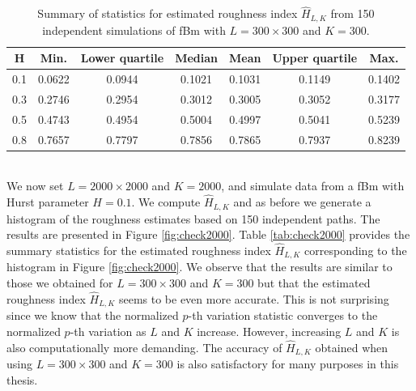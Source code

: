 \documentclass{article}
\begin{document}
\begin{table}[htbp]
    \centering
    \begin{tabular}{ccccccc}
        \toprule
        H & Min. & Lower quartile & Median & Mean & Upper quartile & Max. \\
        \midrule
        0.1 & 0.0622 & 0.0944 & 0.1021 & 0.1031 & 0.1149 & 0.1402 \\
        0.3 & 0.2746 & 0.2954 & 0.3012 & 0.3005 & 0.3052 & 0.3177 \\
        0.5 & 0.4743 & 0.4954 & 0.5004 & 0.4997 & 0.5041 & 0.5239 \\
        0.8 & 0.7657 & 0.7797 & 0.7856 & 0.7865 & 0.7937 & 0.8239 \\
        \bottomrule
    \end{tabular}
    \caption{Summary of statistics for estimated roughness index $\widehat{H}_{L,K}$ from 150 independent simulations of fBm with $L=300\times 300$ and $K=300$.}
    \label{tab:checkhist}
\end{table}\\
We now set $L=2000\times 2000$ and $K=2000$, and simulate data from a fBm with Hurst parameter $H=0.1$. We compute $\hat{H}_{L,K}$ and as before we generate a histogram of the roughness estimates based on 150 independent paths. The results are presented in Figure \ref{fig:check2000}. Table \ref{tab:check2000} provides the summary statistics for the estimated roughness index $\widehat{H}_{L,K}$ corresponding to the histogram in Figure \ref{fig:check2000}. We observe that the results are similar to those we obtained for $L=300\times 300$ and $K=300$ but that the estimated roughness index $\hat{H}_{L,K}$ seems to be even more accurate. This is not surprising since we know that the normalized $p$-th variation statistic converges to the normalized $p$-th variation as $L$ and $K$ increase. However, increasing $L$ and $K$ is also computationally more demanding. The accuracy of $\widehat{H}_{L,K}$ obtained when using $L=300\times 300$ and $K=300$ is also satisfactory for many purposes in this thesis.
\end{document}
